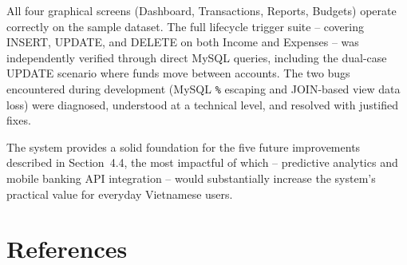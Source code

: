 \documentclass[12pt, a4paper]{article}
\begin{document}
All four graphical screens (Dashboard, Transactions, Reports, Budgets) operate correctly
on the sample dataset. The full lifecycle trigger suite -- covering INSERT, UPDATE, and
DELETE on both Income and Expenses -- was independently verified through direct MySQL
queries, including the dual-case UPDATE scenario where funds move between accounts.
The two bugs encountered during development (MySQL \texttt{\%} escaping and JOIN-based
view data loss) were diagnosed, understood at a technical level, and resolved with
justified fixes.

The system provides a solid foundation for the five future improvements described in
Section~4.4, the most impactful of which -- predictive analytics and mobile banking
API integration -- would substantially increase the system's practical value for
everyday Vietnamese users.

\newpage

\section*{References}
\end{document}
